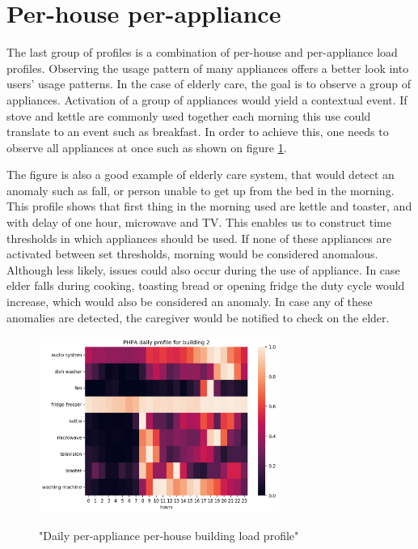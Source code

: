 \section{Per-house per-appliance}

The last group of profiles is a combination of per-house and per-appliance load profiles.
Observing the usage pattern of many appliances offers a better look into users' usage patterns.
In the case of elderly care, the goal is to observe a group of appliances.
Activation of a group of appliances would yield a contextual event.
If stove and kettle are commonly used together each morning this use could translate to an event such as breakfast. 
In order to achieve this, one needs to observe all appliances at once such as shown on figure \ref{fig:PHPA}.

The figure is also a good example of elderly care system, that would detect an anomaly such as fall, or person unable to get up from the bed in the morning.
This profile shows that first thing in the morning used are kettle and toaster, and with delay of one hour, microwave and TV. 
This enables us to construct time thresholds in which appliances should be used.
If none of these appliances are activated between set thresholds, morning would be considered anomalous.
Although less likely, issues could also occur during the use of appliance. 
In case elder falls during cooking, toasting bread or opening fridge the duty cycle would increase, which would also be considered an anomaly.
In case any of these anomalies are detected, the caregiver would be notified to check on the elder. 

\begin{figure}[H]
	
	\centering
	\caption{"Daily per-appliance per-house building load profile"}
	\includegraphics[width=0.7\textwidth]{../Figures/LPS/PHPA.png}
	\label{fig:PHPA}
\end{figure}

